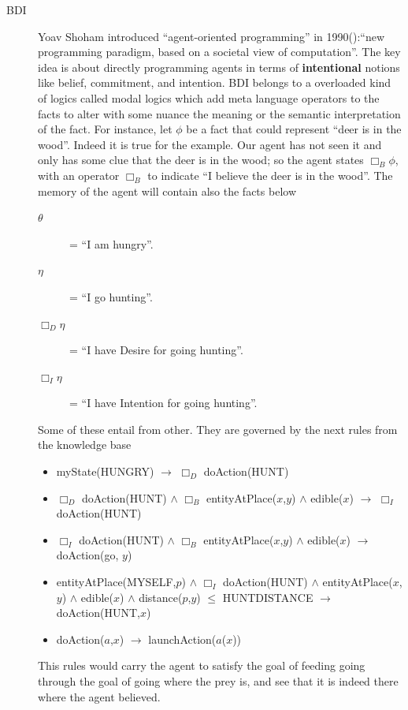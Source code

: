 \documentclass{report}
\begin{document}
\begin{description}
\begin{description}
		\item [BDI] Yoav Shoham introduced “agent-oriented programming” in 1990(\cite{Shoham1990}):“new 
		programming paradigm, based on a societal view of computation”. The key idea is about directly 
		programming agents in terms of \textbf{intentional} notions like belief, commitment, and intention.
		BDI belongs to a overloaded kind of logics called modal logics which add meta language operators to
		the facts to alter with some nuance the meaning or the semantic interpretation of the fact.
		For instance, let $\phi$ be a fact that could represent ``deer is in the wood''. Indeed it is true
		for the example. Our agent has not seen it and only has some clue that the deer is in the 
		wood; so the agent states $\Box_B \phi$, with an operator $\Box_B$ to indicate ``I believe the 
		deer is in the wood''. The memory of the agent will contain also the facts below
		\begin{description}
		\item[$\theta$] = ``I am hungry''.
		\item[$\eta$] = ``I go hunting''.
		\item [$\Box_D \eta$] = ``I have Desire for going hunting''.
		\item [$\Box_I \eta$] = ``I have Intention for going hunting''.
		\end{description}
		Some of these entail from other. They are governed by the next rules from the knowledge base
		\begin{itemize}
		\item myState(HUNGRY) 
			$\rightarrow$ $\Box_D$ doAction(HUNT)
		\item $\Box_D$ doAction(HUNT) $\wedge$ $\Box_B$ entityAtPlace($x$,$y$) $\wedge$ edible($x$) 
			$\rightarrow$ $\Box_I$ doAction(HUNT)
		\item $\Box_I$ doAction(HUNT) $\wedge$ $\Box_B$ entityAtPlace($x$,$y$) $\wedge$ edible($x$) 
			$\rightarrow$ doAction(go, $y$)
		\item entityAtPlace(MYSELF,$p$) $\wedge$ $\Box_I$ doAction(HUNT) $\wedge$ entityAtPlace($x$,$y$) $\wedge$ edible($x$) $\wedge$ distance($p$,$y$) $\leq$ HUNTDISTANCE	
			$\rightarrow$ doAction(HUNT,$x$)
		\item doAction($a$,$x$) $\rightarrow$ launchAction($a$($x$))
		\end{itemize}

		This rules would carry the agent to satisfy the goal of feeding going through the goal of going where the
		prey is, and see that it is indeed there where the agent believed.


\end{description}
\end{description}
\end{document}
